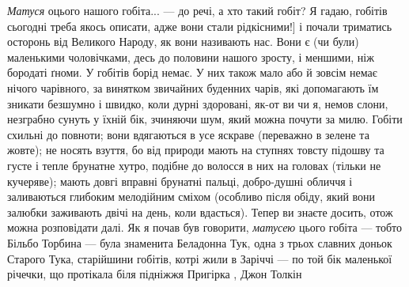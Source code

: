 \emph{Матуся} оцього нашого гобіта... — до речі, а хто такий гобіт? Я гадаю, гобітів
сьогодні треба якось описати, адже вони стали рідкісними!] і почали триматись
осторонь від Великого Народу, як вони називають нас. Вони є (чи були)
маленькими чоловічками, десь до половини нашого зросту, і меншими, ніж бородаті
ґноми. У гобітів борід немає. У них також мало або й зовсім немає нічого
чарівного, за винятком звичайних буденних чарів, які допомагають їм зникати
безшумно і швидко, коли дурні здоровані, як-от ви чи я, немов слони, незграбно
сунуть у їхній бік, зчиняючи шум, який можна почути за милю. Гобіти схильні до
повноти; вони вдягаються в усе яскраве (переважно в зелене та жовте); не носять
взуття, бо від природи мають на ступнях товсту підошву та густе і тепле
брунатне хутро, подібне до волосся в них на головах (тільки не кучеряве); мають
довгі вправні брунатні пальці, добро-душні обличчя і заливаються глибоким
мелодійним сміхом (особливо після обіду, який вони залюбки заживають двічі на
день, коли вдасться). Тепер ви знаєте досить, отож можна розповідати далі. Як я
почав був говорити, \emph{матусею} цього гобіта — тобто Більбо Торбина — була
знаменита Беладонна Тук, одна з трьох славних доньок Старого Тука, старійшини
гобітів, котрі жили в Заріччі — по той бік маленької річечки, що протікала біля
підніжжя Пригірка
, Джон Толкін
